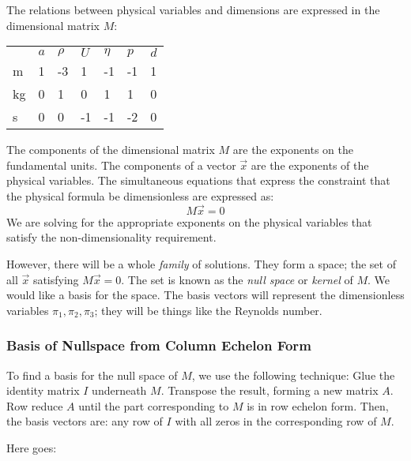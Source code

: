 \documentclass[a4paper]{report}
\begin{document}
The relations between physical variables and dimensions are expressed in the dimensional matrix $M$:

\begin{center}
\begin{tabular}{l l l l l l l }
   & $a$ & $\rho$ & $U$ & $\eta$ & $p$  & $d$ \\
m  & 1   &  -3    &  1  &   -1   &  -1  & 1  \\
kg & 0   &  1     &  0  &    1   &  1   & 0  \\
s  & 0   &  0     &  -1 &   -1   &  -2  & 0  \\
\end{tabular}
\end{center}

The components of the dimensional matrix $M$ are the exponents on the fundamental units.  The components of a vector $\vec{x}$ are the exponents of the physical variables.  The simultaneous equations that express the constraint that the physical formula be dimensionless are expressed as:
\begin{equation}
M \vec{x} = 0
\end{equation}
We are solving for the appropriate exponents on the physical variables that satisfy the non-dimensionality requirement.

However, there will be a whole \emph{family} of solutions. They form a space; the set of all $\vec{x}$ satisfying $M\vec{x}= 0$.  The set is known as the \emph{null space} or \emph{kernel} of $M$.  We would like a basis for the space.  The basis vectors will represent the dimensionless variables $\pi_1,\pi_2, \pi_3$; they will be things like the Reynolds number.

\subsubsection*{Basis of Nullspace from Column Echelon Form}

To find a basis for the null space of $M$, we use the following technique:
Glue the identity matrix $I$ underneath $M$.  Transpose the result, forming a new matrix $A$.  Row reduce $A$ until the part corresponding to $M$ is in row echelon form.  Then, the basis vectors are: any row of $I$ with all zeros in the corresponding row of $M$.

Here goes:
\end{document}
